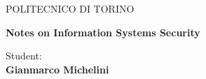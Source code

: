\begin{titlepage}
\begin{figure}[!htb]
    \centering
\end{figure}
\vspace{30mm}
\begin{center}
    \LARGE{POLITECNICO DI TORINO}
    \vspace{5mm}
\end{center}

\vspace{15mm}
\begin{center}        
    {\LARGE{\bf Notes on Information Systems Security}}
\end{center}
\vspace{30mm}

\hfill
\begin{minipage}[t]{0.47\textwidth}\raggedleft
	{\large{Student:}{\normalsize\vspace{3mm} \bf\\ \large{Gianmarco Michelini}}}
\end{minipage}

\vspace{30mm}
\hrulefill
\\

\end{titlepage}